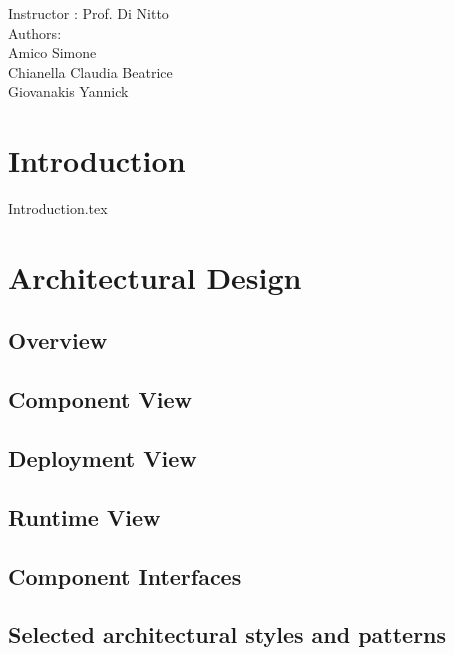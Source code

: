 \documentclass[12pt]{article}
\begin{document}
	\begin{center}
	 	{\Large Instructor : Prof. Di Nitto}
	 	 \vspace{5mm}\\	 
	 	{\Large Authors:}\\
	 	{\Large Amico Simone}\\
	 	{\Large Chianella Claudia Beatrice}\\
	 	{\Large Giovanakis Yannick}
	\end{center}
	 
	\newpage
	
	
	\tableofcontents{}
	 
	\newpage
		
	
	\section{Introduction}
	{Introduction.tex}
	
	
	\section{Architectural Design}
	\newpage
	\subsection{Overview}
	\newpage
	\subsection{Component View}
	\newpage
	\subsection{Deployment View}
	\newpage
	\subsection{Runtime View}
	\newpage
	\subsection{Component Interfaces}
	\newpage
	\subsection{Selected architectural styles and patterns}
	\newpage
\end{document}
